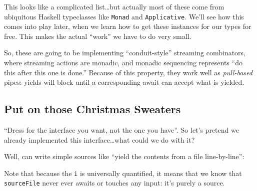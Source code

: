 \documentclass[]{article}
\newenvironment{Shaded}{}{}
\newcommand{\CommentTok}[1]{\textcolor[rgb]{0.38,0.63,0.69}{\textit{#1}}}
\newcommand{\DataTypeTok}[1]{\textcolor[rgb]{0.56,0.13,0.00}{#1}}
\newcommand{\FunctionTok}[1]{\textcolor[rgb]{0.02,0.16,0.49}{#1}}
\newcommand{\KeywordTok}[1]{\textcolor[rgb]{0.00,0.44,0.13}{\textbf{#1}}}
\newcommand{\NormalTok}[1]{#1}
\newcommand{\OperatorTok}[1]{\textcolor[rgb]{0.40,0.40,0.40}{#1}}
\newcommand{\OtherTok}[1]{\textcolor[rgb]{0.00,0.44,0.13}{#1}}
\begin{document}
This looks like a complicated list\ldots but actually most of these come from
ubiquitous Haskell typeclasses like \texttt{Monad} and \texttt{Applicative}.
We'll see how this comes into play later, when we learn how to get these
instances for our types for free. This makes the actual ``work'' we have to do
very small.

So, these are going to be implementing ``conduit-style'' streaming combinators,
where streaming actions are monadic, and monadic sequencing represents ``do this
after this one is done.'' Because of this property, they work well as
\emph{pull-based} pipes: yields will block until a corresponding await can
accept what is yielded.

\subsection{Put on those Christmas
Sweaters}\label{put-on-those-christmas-sweaters}

``Dress for the interface you want, not the one you have''. So let's pretend we
already implemented this interface\ldots what could we do with it?

Well, can write simple sources like ``yield the contents from a file
line-by-line'':

\begin{Shaded}
\end{Shaded}

Note that because the \texttt{i} is universally quantified, it means that we
know that \texttt{sourceFile} never ever awaits or touches any input: it's
purely a source.
\end{document}
